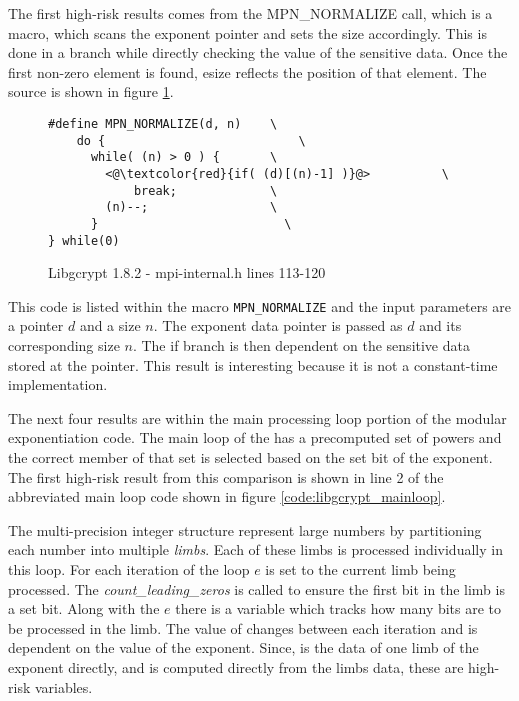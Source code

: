      The first high-risk results comes from the MPN\_NORMALIZE call, which is a
     macro, which scans the exponent pointer and sets the size accordingly. This
     is done in a branch while directly checking the value of the sensitive
     data. Once the first non-zero element is found, esize reflects the position
     of that element. The source is shown in figure \ref{code:libgcrypt_normalize}.

\begin{figure}[h!]
\begin{lstlisting}
#define MPN_NORMALIZE(d, n)    \
    do {		                   \
      while( (n) > 0 ) {       \
        <@\textcolor{red}{if( (d)[(n)-1] )}@>          \
            break;	           \
        (n)--;	               \
      }		                     \
} while(0)
\end{lstlisting}
\caption{Libgcrypt 1.8.2 - mpi-internal.h lines 113-120}
\label{code:libgcrypt_normalize}
\end{figure}

This code is listed within the macro \texttt{MPN\_NORMALIZE} and the input
parameters are a pointer $d$ and a size $n$. The exponent data pointer is passed
as $d$ and its corresponding size $n$. The if branch is then dependent on the
sensitive data stored at the pointer. This result is interesting because it is
not a constant-time implementation.

The next four results are within the main processing loop portion of the modular
exponentiation code. The main loop of the has a precomputed set of powers and
the correct member of that set is selected based on the set bit of the exponent.
The first high-risk result from this comparison is shown in line 2 of the
abbreviated main loop code shown in figure \ref{code:libgcrypt_mainloop}.

The multi-precision integer structure represent large numbers by partitioning
each number into multiple \textit{limbs}. Each of these limbs is
processed individually in this loop. For each iteration of the loop $e$ is set
to the current limb being processed. The \textit{count\_leading\_zeros}
is called to ensure the first bit in the limb is a set bit. Along with the $e$
there is a variable  which tracks how many bits are to be processed in the
limb. The value of \codevar{c} changes between each iteration and is dependent on the
value of the exponent. Since, \codevar{e} is the data of one limb of the exponent
directly, and \codevar{c} is computed directly from the limbs data, these are high-risk
variables.


